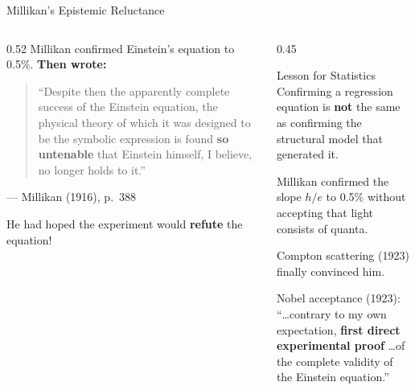 \documentclass[aspectratio=169,12pt]{beamer}
\begin{document}
\begin{frame}[shrink=12]{Millikan's Epistemic Reluctance}

\begin{columns}[T]
\begin{column}{0.52\textwidth}
Millikan confirmed Einstein's equation to 0.5\%.  \textbf{Then wrote:}

\bigskip
\begin{quote}
``Despite then the apparently complete success of the Einstein equation,
the physical theory of which it was designed to be the symbolic expression
is found \textbf{so untenable} that Einstein himself, I believe, no longer
holds to it.''
\end{quote}
\hfill\small{--- Millikan (1916), p.\ 388}

\bigskip
He had hoped the experiment would \textbf{refute} the equation!
\end{column}
\begin{column}{0.45\textwidth}
\begin{block}{Lesson for Statistics}
Confirming a regression equation is \textbf{not} the same as confirming
the structural model that generated it.

\bigskip
Millikan confirmed the slope $h/e$ to 0.5\% without accepting that light
consists of quanta.
\end{block}

\medskip
Compton scattering (1923) finally convinced him.

\smallskip
Nobel acceptance (1923):\\
``\ldots contrary to my own expectation,
\textbf{first direct experimental proof}
\ldots of the complete validity of the
Einstein equation.''
\end{column}
\end{columns}

\end{frame}
\end{document}
